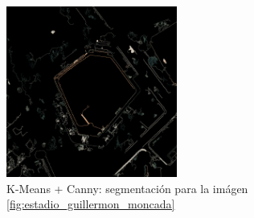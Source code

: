 \documentclass[article]{llncs}
\begin{document}
\begin{figure}[h]
  \centering
  \includegraphics[width=0.5\textwidth]{canny.png}
  \caption{K-Means + Canny: segmentación para la im\'agen \ref{fig:estadio_guillermon_moncada}}
  \label{fig:canny}
\end{figure}
\end{document}
